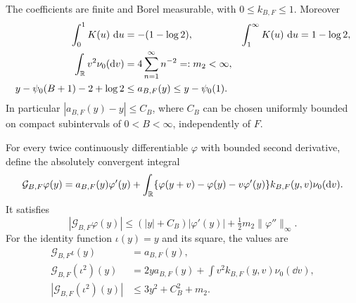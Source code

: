 \begin{lemma}
\label{lem:bounds}
The coefficients are finite and Borel measurable, with $0\leq k_{B,F}\leq1$.
Moreover
\begin{align}
 \int_0^1 K(u)\,\mathop{}\!\mathrm d u&=-(1-\log2),&
 \int_1^\infty K(u)\,\mathop{}\!\mathrm d u&=1-\log2,\label{eq:K-integrals}\\
 \int_{\mathbb R}v^2\nu_0(\mathop{}\!\mathrm d v)&=4\sum_{n=1}^\infty n^{-2}
 =:m_2<\infty,\label{eq:m2}\\
 y-\psi_0(B+1)-2+\log2
 &\leq a_{B,F}(y)\leq y-\psi_0(1).
 \label{eq:drift-bounds}
\end{align}
In particular $|a_{B,F}(y)-y|\leq C_B$, where $C_B$ can be chosen uniformly bounded on compact subintervals of $0<B<\infty$, independently of $F$.

For every twice continuously differentiable $\varphi$ with bounded second derivative, define the absolutely convergent integral
\begin{equation}
 \mathcal G_{B,F}\varphi(y)
 =a_{B,F}(y)\varphi'(y)
 +\int_{\mathbb R}\{
   \varphi(y+v)-\varphi(y)-v\varphi'(y)
   \}k_{B,F}(y,v)\nu_0(\mathop{}\!\mathrm d v).
 \label{eq:generator}
\end{equation}
It satisfies
\begin{equation}
 |\mathcal G_{B,F}\varphi(y)|
 \leq (|y|+C_B)|\varphi'(y)|
      +\tfrac12m_2\|\varphi''\|_\infty.
 \label{eq:generator-bound}
\end{equation}
For the identity function $\iota(y)=y$ and its square, the values are
\begin{align}
 \mathcal G_{B,F}\iota(y)&=a_{B,F}(y),\label{eq:linear-test}\\
 \mathcal G_{B,F}(\iota^2)(y)&=2ya_{B,F}(y)
          +\int v^2k_{B,F}(y,v)\nu_0(\dd v),\label{eq:quadratic-test}\\
 |\mathcal G_{B,F}(\iota^2)(y)|&\leq3y^2+C_B^2+m_2.
 \label{eq:quadratic-bound}
\end{align}
\end{lemma}

